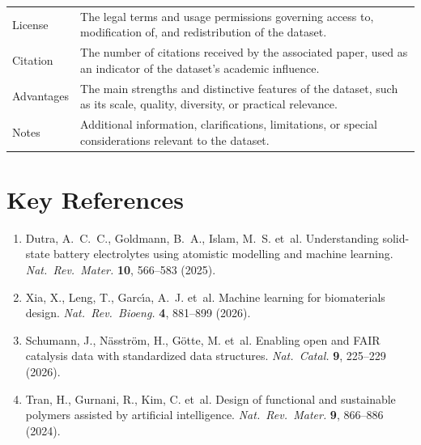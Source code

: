 \documentclass[11pt,a4paper]{article}
\begin{document}
\begin{longtable}{@{}L{4.2cm}L{9.6cm}@{}}
License                      & The legal terms and usage permissions governing access to, modification of, and redistribution of the dataset. \\
Citation                     & The number of citations received by the associated paper, used as an indicator of the dataset's academic influence. \\
Advantages                   & The main strengths and distinctive features of the dataset, such as its scale, quality, diversity, or practical relevance. \\
Notes                        & Additional information, clarifications, limitations, or special considerations relevant to the dataset. \\
\end{longtable}

\section*{Key References}
\begin{enumerate}[leftmargin=1.6em,itemsep=4pt,topsep=2pt]
  \item Dutra, A.~C.~C., Goldmann, B.~A., Islam, M.~S. et~al.
        Understanding solid-state battery electrolytes using atomistic
        modelling and machine learning.
        \emph{Nat.\ Rev.\ Mater.} \textbf{10}, 566--583 (2025).
  \item Xia, X., Leng, T., Garc\'{\i}a, A.~J. et~al.
        Machine learning for biomaterials design.
        \emph{Nat.\ Rev.\ Bioeng.} \textbf{4}, 881--899 (2026).
  \item Schumann, J., N\"asstr\"om, H., G\"otte, M. et~al.
        Enabling open and FAIR catalysis data with standardized data
        structures.
        \emph{Nat.\ Catal.} \textbf{9}, 225--229 (2026).
  \item Tran, H., Gurnani, R., Kim, C. et~al.
        Design of functional and sustainable polymers assisted by
        artificial intelligence.
        \emph{Nat.\ Rev.\ Mater.} \textbf{9}, 866--886 (2024).
\end{enumerate}

\end{document}
